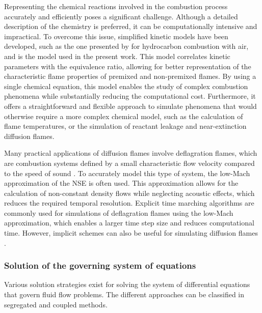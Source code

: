 Representing the chemical reactions involved in the combustion process accurately and efficiently poses a significant challenge. Although a detailed description of the chemistry is preferred, it can be computationally intensive and impractical. To overcome this issue, simplified kinetic models have been developed, such as the one presented by \textcite{fernandez-tarrazoSimpleOnestepChemistry2006} for hydrocarbon combustion with air, and is the model used in the present work. This model correlates kinetic parameters with the equivalence ratio, allowing for better representation of the characteristic flame properties of premixed and non-premixed flames. By using a single chemical equation, this model enables the study of complex combustion phenomena while substantially reducing the computational cost. Furthermore, it offers a straightforward and flexible approach to simulate phenomena that would otherwise require a more complex chemical model, such as the calculation of flame temperatures, or the simulation of reactant leakage and near-extinction diffusion flames.
 
Many practical applications of diffusion flames involve deflagration flames, which are combustion systems defined by a small characteristic flow velocity compared to the speed of sound  \parencite{poinsotTheoreticalNumericalCombustion2011}. To accurately model this type of system, the low-Mach approximation of the \Gls{NSE} is often used. This approximation allows for the calculation of non-constant density flows while neglecting acoustic effects, which reduces the required temporal resolution. Explicit time marching algorithms are commonly used for simulations of deflagration flames using the low-Mach approximation, which enables a larger time step size and reduces computational time. However, implicit schemes can also be useful for simulating diffusion flames \parencite{mullerLowMachNumberAsymptoticsNavierStokes1998}. 
\subsubsection{Solution of the governing system of equations}
Various solution strategies exist for solving the system of differential equations that govern fluid flow problems. The different approaches can be classified in segregated and coupled methods.

